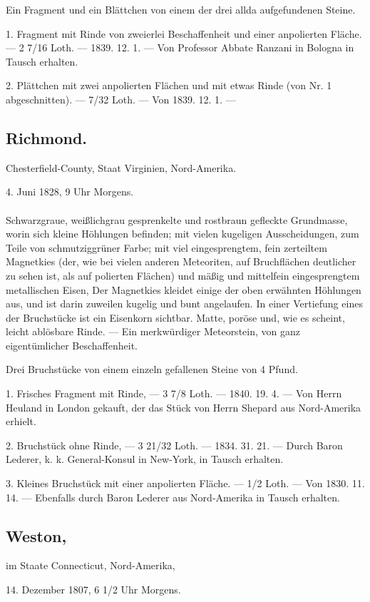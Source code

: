 \documentclass[a4paper, 11pt, oneside, polutonikogreek, german]{article}
\begin{document}
Ein Fragment und ein Blättchen von einem der drei allda aufgefundenen Steine.

1. Fragment mit Rinde von zweierlei Beschaffenheit und einer anpolierten Fläche. — 2 7/16 Loth. — 1839. 12. 1. — Von Professor Abbate Ranzani in Bologna in Tausch erhalten.

2. Plättchen mit zwei anpolierten Flächen und mit etwas Rinde (von Nr. 1 abgeschnitten). — 7/32 Loth. — Von 1839. 12. 1. —
\subsection{Richmond.}
\begin{center}
\small
Chesterfield-County, Staat Virginien, Nord-Amerika.

4. Juni 1828, 9 Uhr Morgens.
\end{center}
\paragraph{}
Schwarzgraue, weißlichgrau gesprenkelte und rostbraun gefleckte Grundmasse, worin sich kleine Höhlungen befinden; mit vielen kugeligen Ausscheidungen, zum Teile von schmutziggrüner Farbe; mit viel eingesprengtem, fein zerteiltem Magnetkies (der, wie bei vielen anderen Meteoriten, auf Bruchflächen deutlicher zu sehen ist, als auf polierten Flächen) und mäßig und mittelfein eingesprengtem metallischen Eisen, Der Magnetkies kleidet einige der oben erwähnten Höhlungen aus, und ist darin zuweilen kugelig und bunt angelaufen. In einer Vertiefung eines der Bruchstücke ist ein Eisenkorn sichtbar. Matte, poröse und, wie es scheint, leicht ablösbare Rinde. — Ein merkwürdiger Meteorstein, von ganz eigentümlicher Beschaffenheit.

Drei Bruchstücke von einem einzeln gefallenen Steine von 4 Pfund.

1. Frisches Fragment mit Rinde, — 3 7/8 Loth. — 1840. 19. 4. — Von Herrn Heuland in London gekauft, der das Stück von Herrn Shepard aus Nord-Amerika erhielt.

2. Bruchstück ohne Rinde, — 3 21/32 Loth. — 1834. 31. 21. — Durch Baron Lederer, k. k. General-Konsul in New-York, in Tausch erhalten.

3. Kleines Bruchstück mit einer anpolierten Fläche. — 1/2 Loth. — Von 1830. 11. 14. — Ebenfalls durch Baron Lederer aus Nord-Amerika in Tausch erhalten.
\subsection{Weston,}
\begin{center}
\small
im Staate Connecticut, Nord-Amerika,

14. Dezember 1807, 6 1/2 Uhr Morgens.
\end{center}
\end{document}
